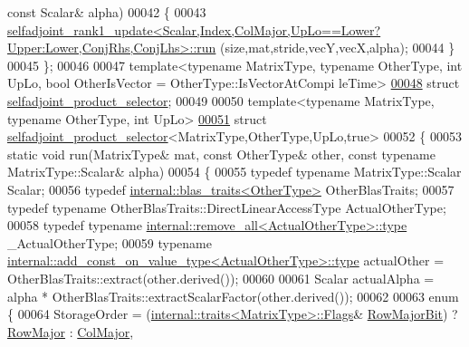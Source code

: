 \begin{DoxyCode}
{      const} Scalar& alpha)
00042   \{
00043     
      \hyperlink{struct_eigen_1_1selfadjoint__rank1__update}{selfadjoint\_rank1\_update<Scalar,Index,ColMajor,UpLo==Lower?Upper:Lower,ConjRhs,ConjLhs>::run}
      (size,mat,stride,vecY,vecX,alpha);
00044   \}
00045 \};
00046 
00047 \textcolor{keyword}{template}<\textcolor{keyword}{typename} MatrixType, \textcolor{keyword}{typename} OtherType, \textcolor{keywordtype}{int} UpLo, \textcolor{keywordtype}{bool} OtherIsVector = OtherType::IsVectorAtCompi
      leTime>
\hyperlink{struct_eigen_1_1selfadjoint__product__selector}{00048} \textcolor{keyword}{struct }\hyperlink{struct_eigen_1_1selfadjoint__product__selector}{selfadjoint\_product\_selector};
00049 
00050 \textcolor{keyword}{template}<\textcolor{keyword}{typename} MatrixType, \textcolor{keyword}{typename} OtherType, \textcolor{keywordtype}{int} UpLo>
\hyperlink{struct_eigen_1_1selfadjoint__product__selector_3_01_matrix_type_00_01_other_type_00_01_up_lo_00_01true_01_4}{00051} \textcolor{keyword}{struct }\hyperlink{struct_eigen_1_1selfadjoint__product__selector}{selfadjoint\_product\_selector}<MatrixType,OtherType,UpLo,true>
00052 \{
00053   \textcolor{keyword}{static} \textcolor{keywordtype}{void} run(MatrixType& mat, \textcolor{keyword}{const} OtherType& other, \textcolor{keyword}{const} \textcolor{keyword}{typename} MatrixType::Scalar& alpha)
00054   \{
00055     \textcolor{keyword}{typedef} \textcolor{keyword}{typename} MatrixType::Scalar Scalar;
00056     \textcolor{keyword}{typedef} \hyperlink{struct_eigen_1_1internal_1_1blas__traits}{internal::blas\_traits<OtherType>} OtherBlasTraits;
00057     \textcolor{keyword}{typedef} \textcolor{keyword}{typename} OtherBlasTraits::DirectLinearAccessType ActualOtherType;
00058     \textcolor{keyword}{typedef} \textcolor{keyword}{typename} \hyperlink{group___sparse_core___module}{internal::remove\_all<ActualOtherType>::type}
       \_ActualOtherType;
00059     \textcolor{keyword}{typename} \hyperlink{group___sparse_core___module}{internal::add\_const\_on\_value\_type<ActualOtherType>::type}
       actualOther = OtherBlasTraits::extract(other.derived());
00060 
00061     Scalar actualAlpha = alpha * OtherBlasTraits::extractScalarFactor(other.derived());
00062 
00063     \textcolor{keyword}{enum} \{
00064       StorageOrder = (\hyperlink{struct_eigen_1_1internal_1_1traits}{internal::traits<MatrixType>::Flags}&
      \hyperlink{group__flags_gae4f56c2a60bbe4bd2e44c5b19cbe8762}{RowMajorBit}) ? \hyperlink{group__enums_ggaacded1a18ae58b0f554751f6cdf9eb13acfcde9cd8677c5f7caf6bd603666aae3}{RowMajor} : \hyperlink{group__enums_ggaacded1a18ae58b0f554751f6cdf9eb13a0cbd4bdd0abcfc0224c5fcb5e4f6669a}{ColMajor},

\end{DoxyCode}

